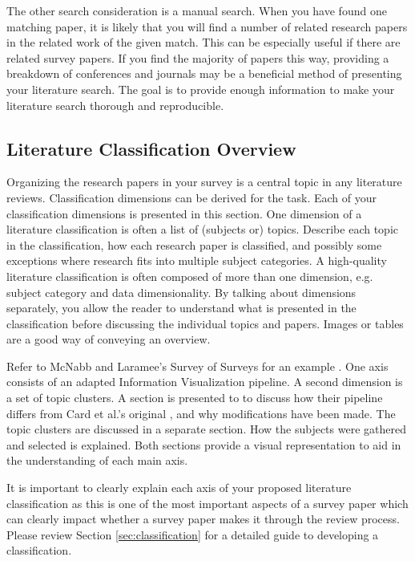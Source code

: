 The other search consideration is a manual search. When you have found one matching paper, it is likely that you will find a number of related research papers in the related work of the given match. This can be especially useful if there are related survey papers. If you find the majority of papers this way, providing a breakdown of conferences and journals may be a beneficial method of presenting your literature search. The goal is to provide enough information to make your literature search thorough and reproducible. 

\subsection{Literature Classification Overview}  \label{sec:overview}
Organizing the research papers in your survey is a central topic in any literature reviews. Classification dimensions can be derived for the task.
Each of your classification dimensions is presented in this section. One dimension of a literature classification is often a list of (subjects or) topics. Describe each topic in the classification, how each research paper is classified, and possibly some exceptions where research fits into multiple subject categories. A high-quality literature classification is often composed of more than one dimension, e.g. subject category and data dimensionality. By talking about dimensions separately, you allow the reader to understand what is presented in the classification before discussing the individual topics and papers. Images or tables are a good way of conveying an overview.

Refer to McNabb and Laramee's Survey of Surveys for an example \cite{mcnabb2017sos}. One axis consists of an adapted Information Visualization pipeline. A second dimension is a set of topic clusters. A section is presented to to discuss how their pipeline differs from Card et al.'s original \cite{card1999readings}, and why modifications have been made. The topic clusters are discussed in a separate section. How the subjects were gathered and selected is explained. Both sections provide a visual representation to aid in the understanding of each main axis.

It is important to clearly explain each axis of your proposed literature classification as this is one of the most important aspects of a survey paper which can clearly impact whether a survey paper makes it through the review process. Please review Section \ref{sec:classification} for a detailed guide to developing a classification.
 
